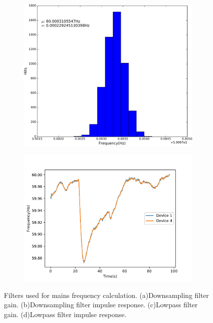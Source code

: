 \begin{figure}[h]
		\centering
	\begin{subfigure}{.5\textwidth}
	  \centering
	  \includegraphics[width=0.9\linewidth]{img/frequency_verification.png}
	  \caption{}
	  \label{fig5:sub1}
	\end{subfigure}%
	\begin{subfigure}{.5\textwidth}
	  \centering
	  \includegraphics[width=1.1\linewidth]{img/frequency_two_devices.pdf}
	  \caption{}
	  \label{fig5:sub2}
	\end{subfigure}
	\caption{Filters used for mains frequency calculation. (a)Downsampling filter gain. (b)Downsampling filter impulse response. (c)Lowpass filter gain. (d)Lowpass filter impulse response.}
	\label{fig:5}
\end{figure}

